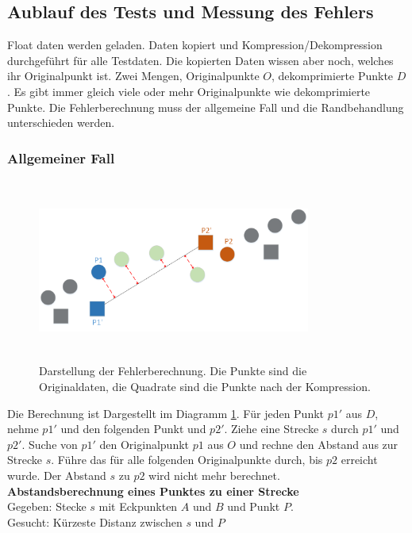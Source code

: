 \subsection{Aublauf des Tests und Messung des Fehlers}\label{testsetup:ablauf}
Float daten werden geladen. Daten kopiert und Kompression/Dekompression durchgeführt für alle Testdaten. Die kopierten Daten wissen aber noch, welches ihr Originalpunkt ist.
Zwei Mengen, Originalpunkte $O$, dekomprimierte Punkte $D$. Es gibt immer gleich viele oder mehr Originalpunkte wie dekomprimierte Punkte. Die Fehlerberechnung muss der allgemeine Fall und die Randbehandlung unterschieden werden.

\subsubsection{Allgemeiner Fall}
\begin{figure}[!htbp]
	\center
	\includegraphics[width=0.8\textwidth,height=6cm,keepaspectratio]{./pictures/testsetup/errorcalc.png}
	\caption{Darstellung der Fehlerberechnung. Die Punkte sind die Originaldaten, die Quadrate sind die Punkte nach der Kompression.}
	\label{testsetup:ablauf:fehlerberechnung:diagramm}
\end{figure} 
Die Berechnung ist Dargestellt im Diagramm \ref{testsetup:ablauf:fehlerberechnung:diagramm}. Für jeden Punkt $p1'$ aus $D$, nehme $p1'$ und den folgenden Punkt und $p2'$. Ziehe eine Strecke $s$ durch $p1'$ und $p2'$. Suche von $p1'$ den Originalpunkt $p1$ aus $O$ und rechne den Abstand aus zur Strecke $s$. Führe das für alle folgenden Originalpunkte durch, bis $p2$ erreicht wurde. Der Abstand $s$ zu $p2$ wird nicht mehr berechnet.\\
[\baselineskip]
\textbf{Abstandsberechnung eines Punktes zu einer Strecke}\\
Gegeben: Stecke $s$ mit Eckpunkten $A$ und $B$ und Punkt $P$.\\
Gesucht: Kürzeste Distanz zwischen $s$ und $P$\\
